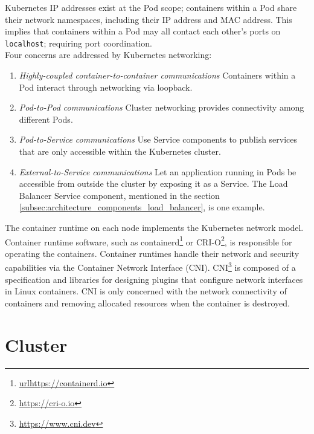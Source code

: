 Kubernetes IP addresses exist at the Pod scope; containers within a Pod share their
network namespaces, including their IP address and MAC address. This implies that
containers within a Pod may all contact each other's ports on \texttt{localhost};
requiring port coordination. \\ %
Four concerns are addressed by Kubernetes networking:
\begin{enumerate}
  \item \textit{Highly-coupled container-to-container communications}
    \newline
    Containers within a Pod interact through networking via loopback.

  \item \textit{Pod-to-Pod communications}
    \newline
    Cluster networking provides connectivity among different Pods.

  \item \textit{Pod-to-Service communications}
    \newline
    Use Service components to publish services that are only accessible within
    the Kubernetes cluster.

  \item \textit{External-to-Service communications}
    \newline
    Let an application running in Pods be accessible from outside the cluster by
    exposing it as a Service. The Load Balancer Service component, mentioned in
    the section \ref{subsec:architecture_components_load_balancer}, is one example.
\end{enumerate}
The container runtime on each node implements the Kubernetes network model. Container
runtime software, such as containerd\footnote{\url{urlhttps://containerd.io}} or
CRI-O\footnote{\url{https://cri-o.io}}, is responsible for operating the containers.
Container runtimes handle their network and security capabilities via the
Container Network Interface (CNI). CNI\footnote{\url{https://www.cni.dev}} is composed
of a specification and libraries for designing plugins that configure network interfaces
in Linux containers. CNI is only concerned with the network connectivity of
containers and removing allocated resources when the container is destroyed.

\section{Cluster}
\label{sec:architecture_cluster}

